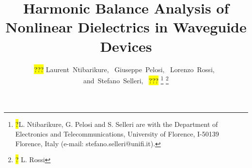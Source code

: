 \documentclass[journal]{IEEEtran}
\begin{document}

%
\title{Harmonic Balance Analysis of Nonlinear Dielectrics in Waveguide Devices}
%
%
%
\author{ \hl{???}
        Laurent~Ntibarikure,~
		Giuseppe~Pelosi,~
		Lorenzo~Rossi,~%
        and~Stefano~Selleri,~
        \hl{???}%
        \thanks{ \hl{?}L. Ntibarikure, G. Pelosi and S. Selleri are with the
        Department of Electronics and Telecommunications, University of 
        Florence, I-50139 Florence, Italy (e-mail: stefano.selleri@unifi.it).}
		\thanks{\hl{?} L. Rossi} 
	  }
 

% 
%
\end{document}
